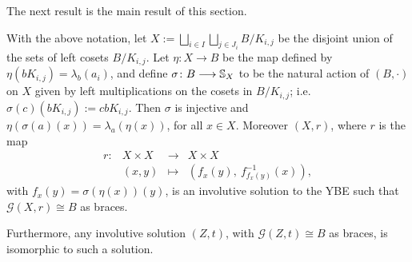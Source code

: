 The next result  is the main result of this section.


\begin{theorem}\label{main}
	With the above notation,  let  $X:=\bigsqcup_{i\in I}\bigsqcup_{j\in
		J_i}B/K_{i,j}$ be the disjoint union of the sets of left cosets
	$B/K_{i,j}$. Let $\eta\colon X\longrightarrow B$ be the map
	defined by $\eta(bK_{i,j})=\lambda_b(a_i)$, and define $\sigma\colon
	B\longrightarrow \mathbb{S}_{X}$ to be the natural action of $(B,\cdot)$
	on $X$ given by left multiplications on the cosets in $B/K_{i,j}$;
	i.e. $\sigma(c)(bK_{i,j}):=cbK_{i,j}$. Then $\sigma$ is injective
	and $\eta(\sigma(a)(x))=\lambda_a(\eta(x))$, for all $x\in X$.
	Moreover $(X,r)$, where $r$ is the map
	$$
	\begin{array}{cccc}
		r\colon& X\times X &\longrightarrow & X\times X\\
		& (x,y) &\mapsto &(f_{x}(y),~f^{-1}_{f_{x}(y)}(x)),
	\end{array}
	$$
	with
	$f_{x}(y)=\sigma(\eta(x))(y)$, is an involutive solution to the YBE such that
	$\mathcal{G}(X,r)\cong B$ as braces.
	
	Furthermore, any involutive solution $(Z,t)$, with $\mathcal{G}(Z,t)\cong
	B$ as braces, is isomorphic to  such a solution.
\end{theorem}

